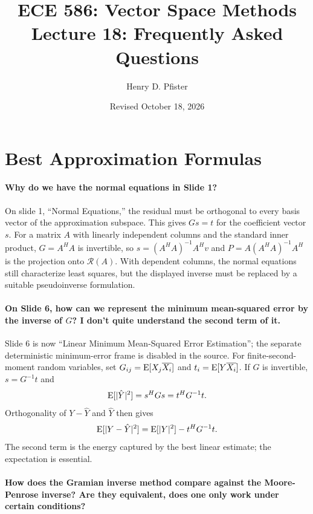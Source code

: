 \documentclass[10pt,english]{article}
\begin{document}
\title{ECE 586: Vector Space Methods \\ Lecture 18: Frequently Asked Questions}
\author{Henry D. Pfister \\ \univ}
\date{Revised October 18, 2026}

\maketitle

\section{Best Approximation Formulas}

\paragraph{Why do we have the normal equations in Slide 1?}


On slide 1, ``Normal Equations,'' the residual must be orthogonal to every basis vector of the approximation subspace.
This gives $Gs=t$ for the coefficient vector $s$.
For a matrix $A$ with linearly independent columns and the standard inner product, $G=A^HA$ is invertible, so $s=(A^HA)^{-1}A^Hv$ and $P=A(A^HA)^{-1}A^H$ is the projection onto $\mathcal{R}(A)$.
With dependent columns, the normal equations still characterize least squares, but the displayed inverse must be replaced by a suitable pseudoinverse formulation.


\paragraph{On Slide 6, how can we represent the minimum mean-squared error by the inverse of $G$? I don't quite understand the second term of it.}

Slide 6 is now ``Linear Minimum Mean-Squared Error Estimation''; the separate deterministic minimum-error frame is disabled in the source.
For finite-second-moment random variables, set $G_{ij}=\mathrm{E}[X_j\overline{X_i}]$ and $t_i=\mathrm{E}[Y\overline{X_i}]$.
If $G$ is invertible, $s=G^{-1}t$ and
\[
\mathrm{E}[|\hat Y|^2]=s^H Gs=t^H G^{-1}t.
\]
Orthogonality of $Y-\hat Y$ and $\hat Y$ then gives
\[
\mathrm{E}[|Y-\hat Y|^2]=\mathrm{E}[|Y|^2]-t^H G^{-1}t.
\]
The second term is the energy captured by the best linear estimate; the expectation is essential.


\paragraph{How does the Gramian inverse method compare against the Moore-Penrose inverse? Are they equivalent, does one only work under certain conditions?}
\end{document}

